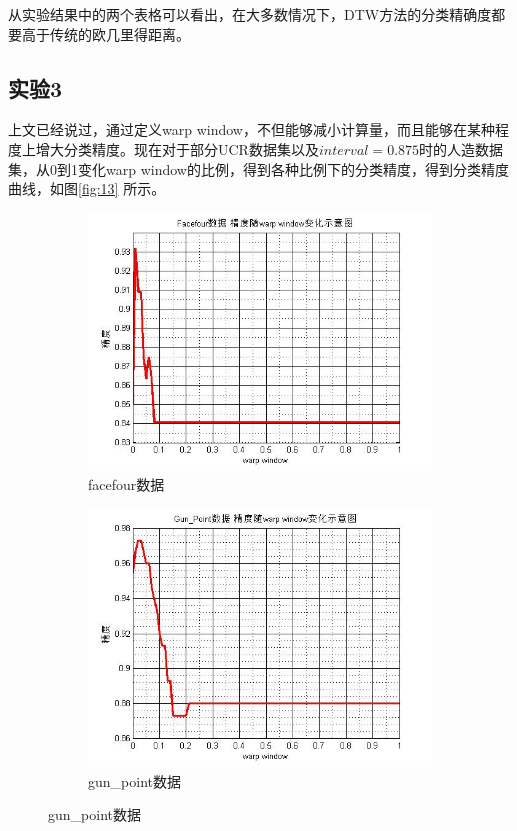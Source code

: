 从实验结果中的两个表格可以看出，在大多数情况下，DTW方法的分类精确度都要高于传统的欧几里得距离。

\subsection{实验3}
上文已经说过，通过定义warp window，不但能够减小计算量，而且能够在某种程度上增大分类精度。现在对于部分UCR数据集以及$interval = 0.875$时的人造数据集，从0到1变化warp window的比例，得到各种比例下的分类精度，得到分类精度曲线，如图\ref{fig:13} 所示。
\begin{figure}[h] \centering
    \begin{subfigure}[t]{0.4\linewidth}
        \includegraphics[width=\linewidth]{./figure/facefour.jpg}
        \caption{facefour数据} \label{fig:subfigure:1}
    \end{subfigure} %
    \quad
    \begin{subfigure}[t]{0.4\linewidth}
        \includegraphics[width=\linewidth]{./figure/gun_point.jpg}
        \caption{gun\_point数据} \label{fig:subfigure:2}
    \end{subfigure}


\end{figure}

